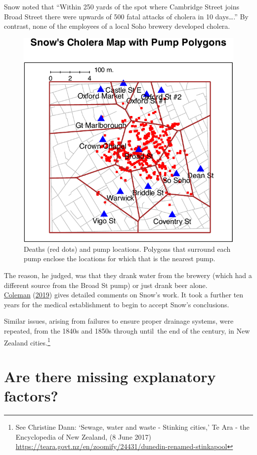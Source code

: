 \documentclass[
  10pt,
  b5paper]{book}
\begin{document}
Snow noted that ``Within 250 yards of the spot where Cambridge Street joins Broad
Street there were upwards of 500 fatal attacks of cholera in 10 days\ldots{}.''
By contrast, none of the employees of a local Soho brewery developed cholera.

\begin{figure}[H]

{\centering \includegraphics[width=0.6\linewidth]{08-observational_files/figure-latex/pump-1} 

}

\caption{Deaths (red dots) and pump locations.  Polygons that surround
each pump enclose the locations for which that is the nearest pump.}\label{fig:pump}
\end{figure}

The reason, he judged, was that they drank water from the brewery (which had a
different source from the Broad St pump) or just drank beer alone.\\
\protect\hyperlink{ref-coleman2019causality}{Coleman} (\protect\hyperlink{ref-coleman2019causality}{2019}) gives detailed comments on Snow's work.
It took a further ten years for the medical establishment to begin to accept
Snow's conclusions.

Similar issues, arising from failures to ensure proper drainage systems,
were repeated, from the 1840s and 1850s through until~the end of the century,
in New Zealand cities.\footnote{See Christine Dann: `Sewage, water and waste - Stinking cities,' Te Ara - the Encyclopedia of New Zealand, (8 June 2017) \url{https://teara.govt.nz/en/zoomify/24431/dunedin-renamed-stinkapool}}

\hypertarget{sec:maternity}{%
\section{Are there missing explanatory factors?}\label{sec:maternity}}
\end{document}
